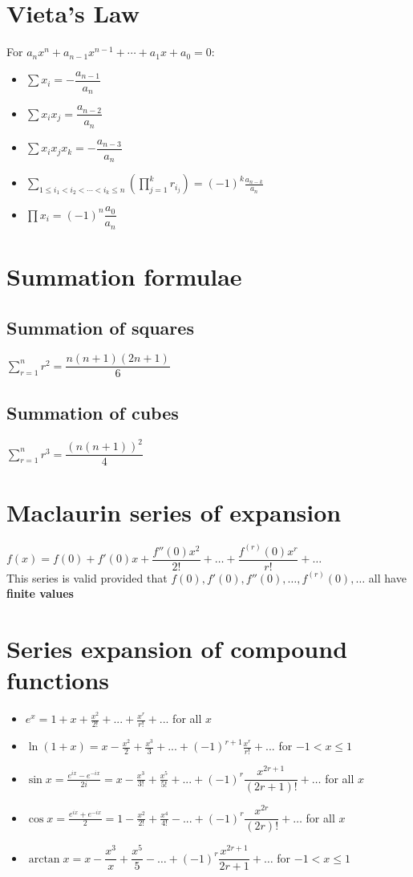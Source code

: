 \section{Vieta's Law}
For $a_{n}x^{n}+a_{n-1}x^{n-1}+\cdots +a_{1}x+a_{0}=0$:
\begin{itemize}
	\item $\sum x_i=-\dfrac{a_{n-1}}{a_n}$
	\item $\sum x_ix_j=\dfrac{a_{n-2}}{a_n}$
	\item $\sum x_ix_jx_k = -\dfrac{a_{n-3}}{a_n}$
	\item $\sum _{1\leq i_{1}<i_{2}<\cdots <i_{k}\leq n}\left(\prod _{j=1}^{k}r_{i_{j}}\right)=(-1)^{k}{\frac {a_{n-k}}{a_{n}}}$
	\item $\prod x_i=(-1)^n\dfrac{a_0}{a_n}$
\end{itemize}
\section{Summation formulae}
\subsection{Summation of squares}
$\sum_{r=1}^{n} r^2=\dfrac{n(n+1)(2n+1)}{6}$ 
\subsection{Summation of cubes}
$\sum_{r=1}^{n} r^3=\dfrac{(n(n+1))^2}{4}$
\section{Maclaurin series of expansion}
$f(x)=f(0)+f'(0)x+\dfrac{f''(0)x^2}{2!}+\dots+\dfrac{f^{(r)}(0)x^r}{r!}+\dots$\\
This series is valid provided that $f(0), f'(0), f''(0),\dots,f^{(r)}(0),\dots$ all have \textbf{finite values}

\section{Series expansion of compound functions}
\begin{itemize}
	\item $e^{x}=1+x+\frac{x^{2}}{2!}+...+\frac{x^{r}}{r!}+...$ for all $x$
	\item $\ln(1+x) = x - \frac{x^{2}}{2} + \frac{x^{3}}{3} + ... + (-1)^{r+1}\frac{x^{r}}{r!} +...$ for $-1<x\leq1$
	\item $\sin x = \frac{e^{ix}-e^{-ix}}{2i}=x-\frac{x^{3}}{3!}+\frac{x^{5}}{5!}+...+(-1)^r\dfrac{x^{2r+1}}{(2r+1)!}+\dots$ for all $x$
	\item $\cos x = \frac{e^{ix}+e^{-ix}}{2}=1-\frac{x^{2}}{2!}+\frac{x^{4}}{4!}-...+(-1)^r\dfrac{x^{2r}}{(2r)!}+\dots$ for all $x$
	\item $\arctan x = x-\dfrac{x^3}{x}+\dfrac{x^5}{5}-\dots+(-1)^r\dfrac{x^{2r+1}}{2r+1}+\dots$ for $-1<x\leq1$
\end{itemize}
